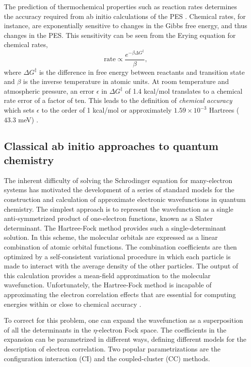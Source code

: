\documentclass[superscriptaddress,aps,pra,twocolumn,nofootinbib,babel]{revtex4-1}
\begin{document}
The prediction of thermochemical properties such as reaction rates determines the accuracy required from ab initio calculations of the PES \cite{peterson.TCA.131.1.2012}. Chemical rates, for instance, are exponentially sensitive to changes in the Gibbs free energy, and thus changes in the PES. This sensitivity can be seen from the Erying equation for chemical rates,
\begin{equation}
\textrm{rate} \propto \frac{ e^{-\beta \Delta G^{\ddagger}}}{\beta},
\end{equation}
where $\Delta G^{\ddagger}$ is the difference in free energy between reactants and transition state and $\beta$ is the inverse temperature in atomic units. At room temperature and atmospheric pressure, an error $\epsilon$ in $ \Delta G^{\ddagger}$ of 1.4 kcal/mol translates to a chemical rate error of a factor of ten. This leads to the definition of {\sl chemical accuracy} which sets $\epsilon$ to the order of 1 kcal/mol or approximately $1.59\times 10^{-3}$ Hartrees ($43.3$ meV) \cite{Helgaker2013}.

\subsection{Classical ab initio approaches to quantum chemistry}

The inherent difficulty of solving the Schrodinger equation for many-electron systems has motivated the development of a series of standard models for the construction and calculation of approximate electronic wavefunctions in quantum chemistry. The simplest approach is to represent the wavefunction as a single anti-symmetrized product of one-electron functions, known as a Slater determinant. The Hartree-Fock method provides such a single-determinant solution. In this scheme, the molecular orbitals are expressed as a linear combination of atomic orbital functions. The combination coefficients are then optimized by a self-consistent variational procedure in which each particle is made to interact with the average density of the other particles. The output of this calculation provides a mean-field approximation to the molecular wavefunction. Unfortunately, the Hartree-Fock method is incapable of approximating the electron correlation effects that are essential for computing energies within or close to chemical accuracy \cite{Helgaker2013}.

To correct for this problem, one can expand the wavefunction as a superposition of all the determinants in the $\eta$-electron Fock space. The coefficients in the expansion can be parametrized in different ways, defining different models for the description of electron correlation. Two popular parametrizations are the configuration interaction (CI) and the coupled-cluster (CC) methods. 
\end{document}
